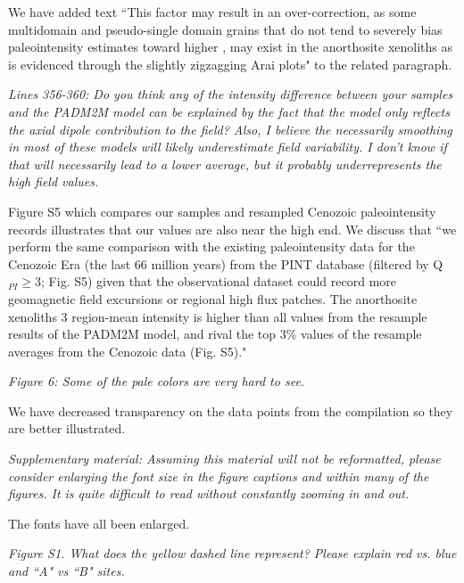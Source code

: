 \documentclass[11pt, letterpaper]{article}
\begin{document}
\begin{flushleft}
We have added text ``This factor may result in an over-correction, as some multidomain and pseudo-single domain grains that do not tend to severely bias paleointensity estimates toward higher \cite{Biggin2013a}, may exist in the anorthosite xenoliths as is evidenced through the slightly zigzagging Arai plots" to the related paragraph. 

\textit{Lines 356-360: Do you think any of the intensity difference between your samples and the PADM2M model can be explained by the fact that the model only reflects the axial dipole contribution to the field? Also, I believe the necessarily smoothing in most of these models will likely underestimate field variability. I don't know if that will necessarily lead to a lower average, but it probably underrepresents the high field values.}

Figure S5 which compares our samples and resampled Cenozoic paleointensity records illustrates that our values are also near the high end. We discuss that ``we perform the same comparison with the existing paleointensity data for the Cenozoic Era (the last 66 million years) from the PINT database (filtered by Q$_{PI}\geq$3; Fig. S5) given that the observational dataset could record more geomagnetic field excursions or regional high flux patches. The anorthosite xenoliths 3 region-mean intensity is higher than all values from the resample results of the PADM2M model, and rival the top 3\% values of the resample averages from the Cenozoic data (Fig. S5)."

\textit{Figure 6: Some of the pale colors are very hard to see.}

We have decreased transparency on the data points from the compilation so they are better illustrated. 

\textit{Supplementary material: Assuming this material will not be reformatted, please consider enlarging the font size in the figure captions and within many of the figures. It is quite difficult to read without constantly zooming in and out.}

The fonts have all been enlarged.

\textit{Figure S1. What does the yellow dashed line represent? Please explain red vs. blue and ``A" vs ``B" sites.}


\end{flushleft}
\end{document}
